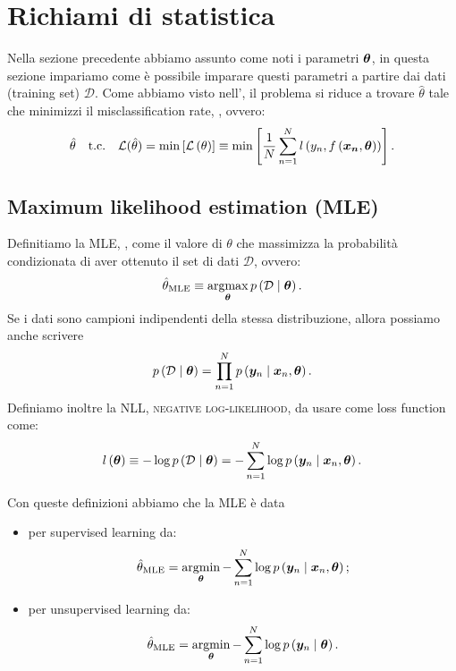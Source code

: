 \documentclass[10pt]{article}
\newcommand{\pare}[1]{
	\ensuremath{\left(#1\right)}
}
\newcommand{\spare}[1]{
	\ensuremath{\left[#1\right]}
}
\begin{document}
\section{Richiami di statistica}
Nella sezione precedente abbiamo assunto come noti i parametri $\bm{\theta}$,
in questa sezione impariamo come è possibile imparare questi parametri a partire
dai dati (training set) $\mathcal{D}$. Come abbiamo visto nell',
il problema si riduce a trovare $\hat{\theta}$ tale che minimizzi il
misclassification rate, , ovvero:
\[
\hat{\theta} \quad\text{t.c.}\quad \mathcal{L}(\hat{\theta}) = \min\spare{\mathcal{L}\pare{\theta}} \equiv \min\spare{\frac{1}{N}\sum_{n=1}^N l\pare{y_n, f\pare{\ve{x_n}, \ve{\theta}}}}.
\]

\subsection{Maximum likelihood estimation (MLE)}
\begin{definition}
Definitiamo la MLE, , come il valore di
$\theta$ che massimizza la probabilità condizionata di aver ottenuto il set di
dati $\mathcal{D}$, ovvero:
\begin{equation}
\hat{\theta}_{\text{MLE}} \equiv \argmax_{\ve{\theta}} p\pare{\mathcal{D}\cond\ve{\theta}}.
\end{equation}
Se i dati sono campioni indipendenti della stessa distribuzione, allora possiamo anche scrivere
\begin{equation}
p\pare{\mathcal{D}\cond\ve{\theta}} = \prod_{n=1}^N p\pare{\ve{y}_n \cond \ve{x}_n, \ve{\theta}}.
\end{equation}
Definiamo inoltre la NLL, \textsc{negative log-likelihood}, da usare come loss function come:
\begin{equation}
l\pare{\ve{\theta}} \equiv -\log p\pare{\mathcal{D}\cond\ve{\theta}} = -\sum_{n=1}^N \log p\pare{\ve{y}_n \cond \ve{x}_n , \ve{\theta}}.
\end{equation}
\end{definition}

Con queste definizioni abbiamo che la MLE è data
\begin{itemize}
\item per supervised learning da:
\begin{equation}
\hat{\theta}_{\text{MLE}} = \argmin_{\ve{\theta}} -\sum_{n=1}^N \log p\pare{\ve{y}_n \cond \ve{x}_n, \ve{\theta}};
\end{equation}
\item per unsupervised learning da:
\begin{equation}
\hat{\theta}_{\text{MLE}} = \argmin_{\ve{\theta}} -\sum_{n=1}^N \log p\pare{\ve{y}_n \cond \ve{\theta}}.
\end{equation}
\end{itemize}
\end{document}
